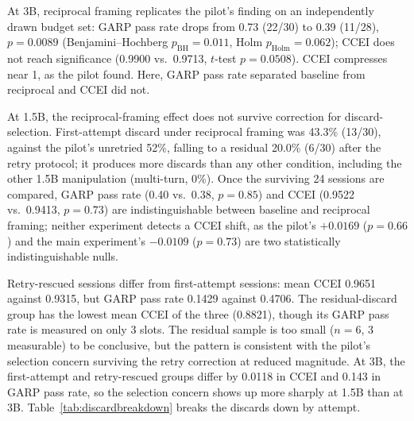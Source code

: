 \documentclass{article}
\begin{document}
At 3B, reciprocal framing replicates the pilot's finding on an independently drawn budget set:
GARP pass rate drops from 0.73 (22/30) to 0.39 (11/28), $p=0.0089$ (Benjamini--Hochberg
$p_{\mathrm{BH}}=0.011$, Holm $p_{\mathrm{Holm}}=0.062$); CCEI does not reach significance
(0.9900 vs.\ 0.9713, $t$-test $p=0.0508$). CCEI compresses near 1, as the pilot found. Here, GARP
pass rate separated baseline from reciprocal and CCEI did not.

At 1.5B, the reciprocal-framing effect does not survive correction for discard-selection.
First-attempt discard under reciprocal framing was 43.3\% (13/30), against the pilot's unretried
52\%, falling to a residual 20.0\% (6/30) after the retry protocol; it produces more discards
than any other condition, including the other 1.5B manipulation (multi-turn, 0\%). Once the
surviving 24 sessions are compared, GARP pass rate (0.40 vs.\ 0.38, $p=0.85$) and CCEI (0.9522
vs.\ 0.9413, $p=0.73$) are indistinguishable between baseline and reciprocal framing; neither
experiment detects a CCEI shift, as the pilot's $+0.0169$ ($p=0.66$) and the main experiment's
$-0.0109$ ($p=0.73$) are two statistically indistinguishable nulls.

Retry-rescued sessions differ from first-attempt sessions: mean CCEI 0.9651 against
0.9315, but GARP pass rate 0.1429 against 0.4706. The residual-discard group has the lowest mean
CCEI of the three (0.8821), though its GARP pass rate is measured on only 3 slots. The residual
sample is too small ($n=6$, 3 measurable) to be conclusive, but the pattern is consistent with the
pilot's selection concern surviving the retry correction at reduced magnitude. At 3B, the
first-attempt and retry-rescued groups differ by 0.0118 in CCEI and 0.143 in GARP pass rate, so
the selection concern shows up more sharply at 1.5B than at 3B. Table~\ref{tab:discardbreakdown}
breaks the discards down by attempt.
\end{document}
